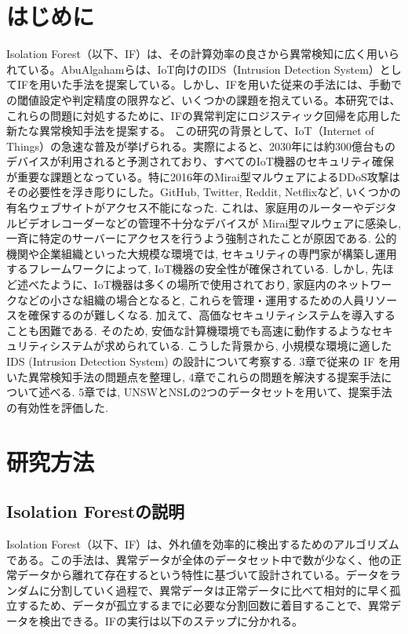 \documentclass{css}
\begin{document}
\section{はじめに}
Isolation Forest（以下、IF）は、その計算効率の良さから異常検知に広く用いられている。AbuAlgahamらは、IoT向けのIDS（Intrusion Detection System）としてIFを用いた手法を提案している。しかし、IFを用いた従来の手法には、手動での閾値設定や判定精度の限界など、いくつかの課題を抱えている。本研究では、これらの問題に対処するために、IFの異常判定にロジスティック回帰を応用した新たな異常検知手法を提案する。
この研究の背景として、IoT（Internet of Things）の急速な普及が挙げられる。実際によると、2030年には約300億台ものデバイスが利用されると予測されており、すべてのIoT機器のセキュリティ確保が重要な課題となっている。特に2016年のMirai型マルウェアによるDDoS攻撃はその必要性を浮き彫りにした。GitHub, Twitter, Reddit, Netflixなど, いくつかの有名ウェブサイトがアクセス不能になった. これは、家庭用のルーターやデジタルビデオレコーダーなどの管理不十分なデバイスが Mirai型マルウェアに感染し, 一斉に特定のサーバーにアクセスを行うよう強制されたことが原因である.
公的機関や企業組織といった大規模な環境では, セキュリティの専門家が構築し運用するフレームワークによって, IoT機器の安全性が確保されている. しかし, 先ほど述べたように、IoT機器は多くの場所で使用されており, 家庭内のネットワークなどの小さな組織の場合となると, これらを管理・運用するための人員リソースを確保するのが難しくなる. 加えて、高価なセキュリティシステムを導入することも困難である. そのため, 安価な計算機環境でも高速に動作するようなセキュリティシステムが求められている.
こうした背景から, 小規模な環境に適した IDS (Intrusion Detection System) の設計について考察する. 3章で従来の IF を用いた異常検知手法の問題点を整理し, 4章でこれらの問題を解決する提案手法について述べる. 5章では, UNSWとNSLの2つのデータセットを用いて、提案手法の有効性を評価した.

\section{研究方法}

\subsection{Isolation Forestの説明}

Isolation Forest（以下、IF）は、外れ値を効率的に検出するためのアルゴリズムである。この手法は、異常データが全体のデータセット中で数が少なく、他の正常データから離れて存在するという特性に基づいて設計されている。データをランダムに分割していく過程で、異常データは正常データに比べて相対的に早く孤立するため、データが孤立するまでに必要な分割回数に着目することで、異常データを検出できる。IFの実行は以下のステップに分かれる。
\end{document}
